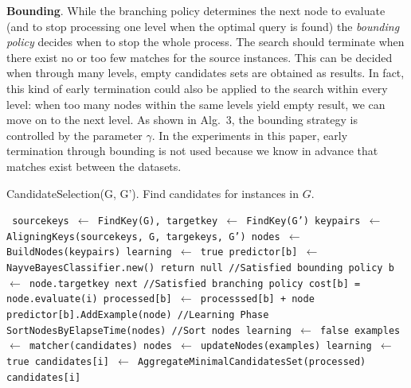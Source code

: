 \textbf{Bounding}. While the branching policy determines the next node to evaluate (and to stop processing one level when the optimal query is found)  the \emph{bounding policy} decides when to stop the whole process. The search should terminate when there exist no or too few matches for the source instances. This can be decided when through many levels, empty candidates sets are obtained as results. In fact, this kind of early termination could also be applied to the search within every level: when too many nodes within the same levels yield empty result, we can move on to the next level. As shown in Alg.~3, the bounding strategy is 
controlled by the parameter $\gamma$. In the experiments in this paper, early termination through bounding is not used because we know in advance that matches exist between the datasets. 
\begin{algorithm}
\caption{CandidateSelection(G, G'). Find candidates for instances in $G$.}
\begin{algorithmic}
\scriptsize\tt
\STATE  sourcekeys  $\leftarrow$ FindKey(G),  targetkey  $\leftarrow$ FindKey(G')
\STATE  keypairs  $\leftarrow$ AligningKeys(sourcekeys, G, targekeys, G') 
\STATE  nodes  $\leftarrow$ BuildNodes(keypairs) 
\STATE  learning  $\leftarrow$ true
\STATE predictor[b] $\leftarrow$ NayveBayesClassifier.new()
\ENDFOR 
{} %
\STATE  return null //Satisfied bounding policy
\ENDIF
{}  
\STATE  b $\leftarrow$ node.targetkey
\STATE next //Satisfied branching policy 
\ENDIF
{}  
\STATE  cost[b] = node.evaluate(i) 
\STATE  processed[b] $\leftarrow$  processsed[b] + node 
\STATE    predictor[b].AddExample(node) //Learning Phase
\ENDIF 
\ENDIF 
\ENDFOR
{} 
\STATE    SortNodesByElapseTime(nodes)  //Sort nodes 
\ENDIF
{} 
\STATE    learning $\leftarrow$ false
\ENDIF
{} 
\STATE  examples  $\leftarrow$ matcher(candidates)
\STATE  nodes  $\leftarrow$ updateNodes(examples) 
\STATE    learning $\leftarrow$ true
\ENDIF
\STATE  candidates[i] $\leftarrow$ AggregateMinimalCandidatesSet(processed)
\ENDFOR 
\RETURN candidates[i]
\end{algorithmic}
\end{algorithm}

